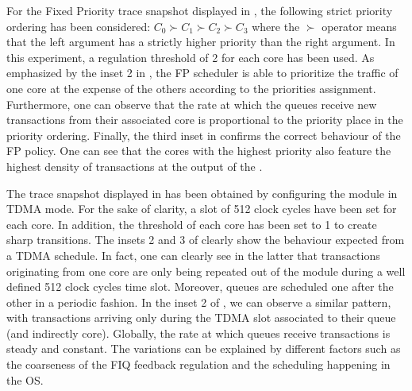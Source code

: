For the Fixed Priority trace snapshot displayed in
, the following strict priority ordering
has been considered: $C_{0} \succ C_{1} \succ C_{2} \succ C_{3}$ where
the $\succ$ operator means that the left argument has a strictly
higher priority than the right argument. In this experiment, a
regulation threshold of 2 for each core has been used.  As emphasized
by the inset 2 in , the FP scheduler is
able to prioritize the traffic of one core at the expense of the
others according to the priorities assignment. Furthermore, one can
observe that the rate at which the queues receive new transactions
from their associated core is proportional to the priority place in
the priority ordering.  Finally, the third inset in
 confirms the correct behaviour of the FP
policy.%
One can see that the cores
with the highest priority also feature the highest density of
transactions at the output of the \schim.

The trace snapshot displayed in  has
been obtained by configuring the \schim module in TDMA mode. For the
sake of clarity, a slot of 512 clock cycles have been set for each
core. In addition, the threshold of each core has been set to 1 to
create sharp transitions.  The insets 2 and 3 of
 clearly show the behaviour expected
from a TDMA schedule. In fact, one can clearly see in the latter that
transactions originating from one core are only being repeated out of
the \schim module during a well defined 512 clock cycles time
slot. Moreover, queues are scheduled one after the other in a periodic
fashion.  In the inset 2 of , we can
observe a similar pattern, with transactions arriving only during the
TDMA slot associated to their queue (and indirectly core). Globally,
the rate at which queues receive transactions is steady and
constant. The variations can be explained by different factors such as
the coarseness of the FIQ feedback regulation and the scheduling
happening in the OS.


